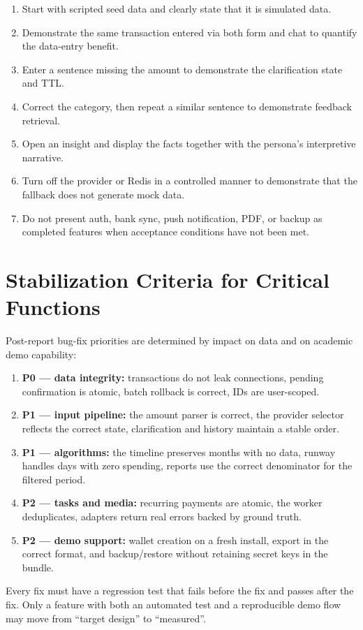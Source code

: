 \begin{enumerate}
  \item Start with scripted seed data and clearly state that it is simulated data.
  \item Demonstrate the same transaction entered via both form and chat to quantify the data-entry benefit.
  \item Enter a sentence missing the amount to demonstrate the clarification state and TTL.
  \item Correct the category, then repeat a similar sentence to demonstrate feedback retrieval.
  \item Open an insight and display the facts together with the persona's interpretive narrative.
  \item Turn off the provider or Redis in a controlled manner to demonstrate that the fallback does not generate mock data.
  \item Do not present auth, bank sync, push notification, PDF, or backup as completed features when acceptance conditions have not been met.
\end{enumerate}

\chapter{Stabilization Criteria for Critical Functions}

Post-report bug-fix priorities are determined by impact on data and on academic demo capability:

\begin{enumerate}
  \item \textbf{P0 --- data integrity:} transactions do not leak connections, pending confirmation is atomic, batch rollback is correct, IDs are user-scoped.
  \item \textbf{P1 --- input pipeline:} the amount parser is correct, the provider selector reflects the correct state, clarification and history maintain a stable order.
  \item \textbf{P1 --- algorithms:} the timeline preserves months with no data, runway handles days with zero spending, reports use the correct denominator for the filtered period.
  \item \textbf{P2 --- tasks and media:} recurring payments are atomic, the worker deduplicates, adapters return real errors backed by ground truth.
  \item \textbf{P2 --- demo support:} wallet creation on a fresh install, export in the correct format, and backup/restore without retaining secret keys in the bundle.
\end{enumerate}

Every fix must have a regression test that fails before the fix and passes after the fix. Only a feature with both an automated test and a reproducible demo flow may move from ``target design'' to ``measured''.
